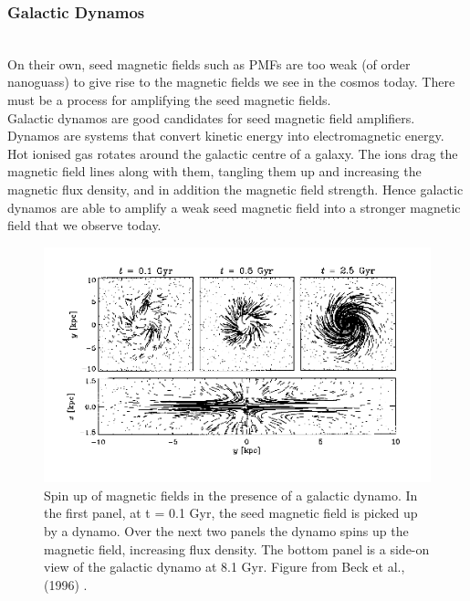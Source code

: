 \subsubsection*{Galactic Dynamos}
\\
On their own, seed magnetic fields such as PMFs are too weak (of order nanoguass) to give rise to the magnetic fields we see in the cosmos today. There must be a process for amplifying the seed magnetic fields. \\Galactic dynamos are good candidates for seed magnetic field amplifiers. Dynamos are systems that convert kinetic energy into electromagnetic energy. Hot ionised gas rotates around the galactic centre of a galaxy. The ions drag the magnetic field lines along with them, tangling them up and increasing the magnetic flux density, and in addition the magnetic field strength. Hence galactic dynamos are able to amplify a weak seed magnetic field into a stronger magnetic field that we observe today.
\begin{figure}
\centering
\includegraphics[scale=1]{images/dynamos_beck.png} 
\caption{Spin up of magnetic fields in the presence of a galactic dynamo. In the first panel, at t = 0.1 Gyr, the seed magnetic field is picked up by a dynamo. Over the next two panels the dynamo spins up the magnetic field, increasing flux density. The bottom panel is a side-on view of the galactic dynamo at 8.1 Gyr. Figure from Beck et al., (1996) \cite{Beck:1996}.}
\end{figure}

